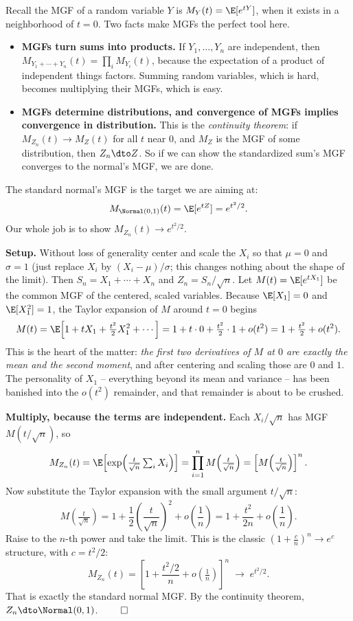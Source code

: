 Recall the MGF of a random variable $Y$ is $M_Y(t) = \E[e^{tY}]$, when it exists in a
neighborhood of $t=0$. Two facts make MGFs the perfect tool here.

\begin{itemize}
\item \textbf{MGFs turn sums into products.} If $Y_1, \dots, Y_n$ are independent, then
$M_{Y_1 + \cdots + Y_n}(t) = \prod_i M_{Y_i}(t)$, because the expectation of a product
of independent things factors. Summing random variables, which is hard, becomes
multiplying their MGFs, which is easy.
\item \textbf{MGFs determine distributions, and convergence of MGFs implies
convergence in distribution.} This is the \emph{continuity theorem}: if
$M_{Z_n}(t) \to M_Z(t)$ for all $t$ near $0$, and $M_Z$ is the MGF of some distribution,
then $Z_n \dto Z$. So if we can show the standardized sum's MGF converges to the normal's
MGF, we are done.
\end{itemize}

The standard normal's MGF is the target we are aiming at:
\[
  M_{\Normal(0,1)}(t) = \E[e^{tZ}] = e^{t^2/2}.
\]
Our whole job is to show $M_{Z_n}(t) \to e^{t^2/2}$.

\textbf{Setup.} Without loss of generality center and scale the $X_i$ so that $\mu = 0$
and $\sigma = 1$ (just replace $X_i$ by $(X_i - \mu)/\sigma$; this changes nothing about
the shape of the limit). Then $S_n = X_1 + \cdots + X_n$ and
$Z_n = S_n / \sqrt{n}$. Let $M(t) = \E[e^{tX_1}]$ be the common MGF of the centered,
scaled variables. Because $\E[X_1] = 0$ and $\E[X_1^2] = 1$, the Taylor expansion of $M$
around $t=0$ begins
\[
  M(t) = \E\!\left[ 1 + tX_1 + \tfrac{t^2}{2} X_1^2 + \cdots \right]
       = 1 + t\cdot 0 + \tfrac{t^2}{2}\cdot 1 + o(t^2)
       = 1 + \tfrac{t^2}{2} + o(t^2).
\]
This is the heart of the matter: \emph{the first two derivatives of $M$ at $0$ are
exactly the mean and the second moment}, and after centering and scaling those are $0$
and $1$. The personality of $X_1$ -- everything beyond its mean and variance -- has been
banished into the $o(t^2)$ remainder, and that remainder is about to be crushed.

\textbf{Multiply, because the terms are independent.} Each $X_i / \sqrt n$ has MGF
$M(t/\sqrt n)$, so
\[
  M_{Z_n}(t) = \E\!\left[ \exp\!\Big( \tfrac{t}{\sqrt n}\textstyle\sum_i X_i \Big) \right]
             = \prod_{i=1}^n M\!\left( \tfrac{t}{\sqrt n} \right)
             = \left[ M\!\left( \tfrac{t}{\sqrt n} \right) \right]^{n}.
\]
Now substitute the Taylor expansion with the small argument $t/\sqrt n$:
\[
  M\!\left( \tfrac{t}{\sqrt n} \right)
   = 1 + \frac{1}{2}\!\left(\frac{t}{\sqrt n}\right)^{\!2} + o\!\left(\frac{1}{n}\right)
   = 1 + \frac{t^2}{2n} + o\!\left(\frac{1}{n}\right).
\]
Raise to the $n$-th power and take the limit. This is the classic
$\left(1 + \frac{c}{n}\right)^n \to e^{c}$ structure, with $c = t^2/2$:
\[
  M_{Z_n}(t) = \left[ 1 + \frac{t^2/2}{n} + o\!\left(\tfrac1n\right) \right]^{n}
             \;\longrightarrow\; e^{t^2/2}.
\]
That is exactly the standard normal MGF. By the continuity theorem,
$Z_n \dto \Normal(0,1)$. $\qed$

